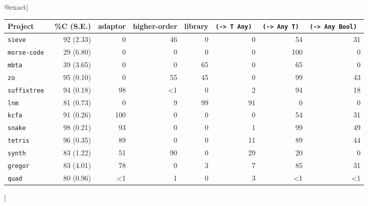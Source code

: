 @exact|{
\begin{tabular}{l r || r r r r r r}
Project         & \%C (S.E.) & adaptor & higher-order & library & \tt{(-> T Any)} & \tt{(-> Any T)} & \tt{(-> Any Bool)} \\\hline
\tt{sieve}      & 92 (2.33)  &       0 &           46 &       0 &             0 &            54 &               31 \\
\tt{morse-code} & 29 (6.80)  &       0 &            0 &       0 &             0 &           100 &                0 \\
\tt{mbta}       & 39 (3.65)  &       0 &            0 &      65 &             0 &            65 &                0 \\
\tt{zo}         & 95 (0.10)  &       0 &           55 &      45 &             0 &            99 &               43 \\
\tt{suffixtree} & 94 (0.18)  &      98 &           <1 &       0 &             2 &            94 &               18 \\
\tt{lnm}        & 81 (0.73)  &       0 &            9 &      99 &            91 &             0 &                0 \\
\tt{kcfa}       & 91 (0.26)  &     100 &            0 &       0 &             0 &            54 &               31 \\
\tt{snake}      & 98 (0.21)  &      93 &            0 &       0 &             1 &            99 &               49 \\
\tt{tetris}     & 96 (0.35)  &      89 &            0 &       0 &            11 &            89 &               44 \\
\tt{synth}      & 83 (1.22)  &      51 &           90 &       0 &            29 &            20 &                0 \\
\tt{gregor}     & 83 (4.01)  &      78 &            0 &       3 &             7 &            85 &               31 \\
\tt{quad}       & 80 (0.96)  &      <1 &            1 &       0 &             3 &            <1 &               <1 \\
\bottomrule
\end{tabular}
}|

